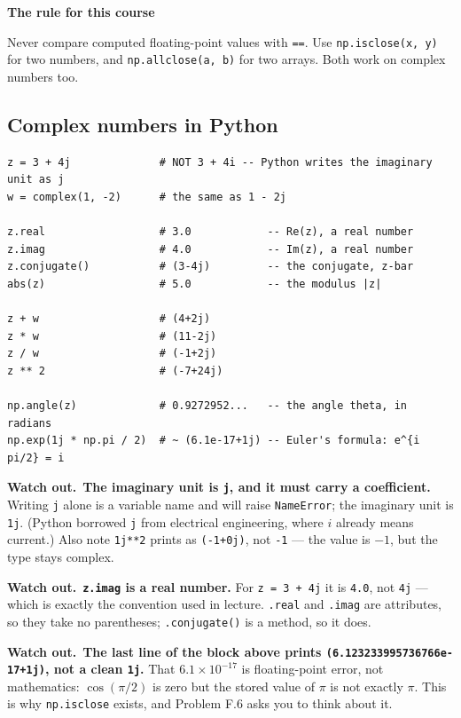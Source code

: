 \documentclass[11pt]{article}
\theoremstyle{definition}
\newcommand{\heads}[1]{\par\smallskip\noindent
  {\small\sffamily\textcolor{BrickRed}{\textbf{Watch out.}}\ #1}\par\smallskip}
\newenvironment{callout}[1]
  {\par\medskip\needspace{5\baselineskip}%
   \begin{lrbox}{\qcbox}%
   \begin{minipage}{\dimexpr\textwidth-2\fboxsep-4pt}%
   \setlength{\parskip}{0.4em}%
   \textbf{\sffamily\color{RoyalBlue}#1}\par}
  {\end{minipage}\end{lrbox}%
   \begin{center}\colorbox{softbg}{\usebox{\qcbox}}\end{center}\medskip}
\begin{document}
\begin{callout}{The rule for this course}
Never compare computed floating-point values with \texttt{==}. Use
\texttt{np.isclose(x, y)} for two numbers, and \texttt{np.allclose(a, b)} for two
arrays. Both work on complex numbers too.
\end{callout}

\subsection{Complex numbers in Python}

\begin{lstlisting}
z = 3 + 4j              # NOT 3 + 4i -- Python writes the imaginary unit as j
w = complex(1, -2)      # the same as 1 - 2j

z.real                  # 3.0            -- Re(z), a real number
z.imag                  # 4.0            -- Im(z), a real number
z.conjugate()           # (3-4j)         -- the conjugate, z-bar
abs(z)                  # 5.0            -- the modulus |z|

z + w                   # (4+2j)
z * w                   # (11-2j)
z / w                   # (-1+2j)
z ** 2                  # (-7+24j)

np.angle(z)             # 0.9272952...   -- the angle theta, in radians
np.exp(1j * np.pi / 2)  # ~ (6.1e-17+1j) -- Euler's formula: e^{i pi/2} = i
\end{lstlisting}

\heads{\textbf{The imaginary unit is \texttt{j}, and it must carry a
coefficient.} Writing \texttt{j} alone is a variable name and will raise
\texttt{NameError}; the imaginary unit is \texttt{1j}. (Python borrowed
\texttt{j} from electrical engineering, where $i$ already means current.) Also
note \texttt{1j**2} prints as \texttt{(-1+0j)}, not \texttt{-1} --- the value is
$-1$, but the type stays complex.}

\heads{\textbf{\texttt{z.imag} is a real number.} For \texttt{z = 3 + 4j} it is
\texttt{4.0}, not \texttt{4j} --- which is exactly the convention used in
lecture. \texttt{.real} and \texttt{.imag} are attributes, so they take no
parentheses; \texttt{.conjugate()} is a method, so it does.}

\heads{\textbf{The last line of the block above prints
\texttt{(6.123233995736766e-17+1j)}, not a clean \texttt{1j}.} That
$6.1\times10^{-17}$ is floating-point error, not mathematics: $\cos(\pi/2)$ is
zero but the stored value of $\pi$ is not exactly $\pi$. This is why
\texttt{np.isclose} exists, and Problem F.6 asks you to think about it.}
\end{document}
